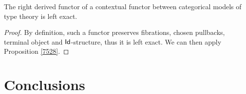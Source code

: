 \begin{thm}
  The right derived functor of a contextual functor between categorical models
  of type theory is left exact.
\end{thm}
\begin{proof}
  By definition, such a functor preserves fibrations, chosen pullbacks, terminal
  object and $\operatorname{\mathsf{Id}}$-structure, thus it is left exact. We can then apply
  Proposition \ref{7528}.
\end{proof}

\section{Conclusions}
